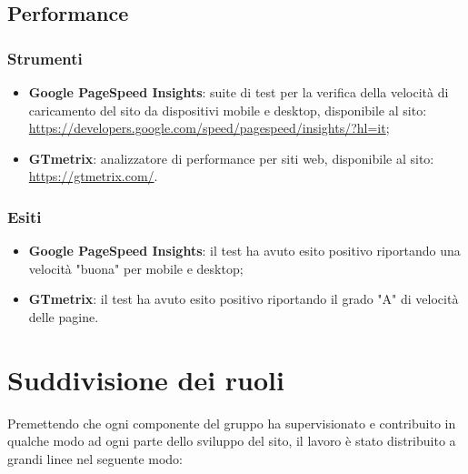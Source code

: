 \documentclass[12pt]{article}
\begin{document}
	\subsection{Performance}
	
	\subsubsection{Strumenti}
	
	\begin{itemize}
		\item \textbf{Google PageSpeed Insights}: suite di test per la verifica della velocità di caricamento del sito da dispositivi mobile e desktop, disponibile al sito:
		\\ \url{https://developers.google.com/speed/pagespeed/insights/?hl=it};
		
		\item \textbf{GTmetrix}: analizzatore di performance per siti web, disponibile al sito:
		\\ \url{https://gtmetrix.com/}.
	\end{itemize}
	
	\subsubsection{Esiti}
	
	\begin{itemize}
		\item \textbf{Google PageSpeed Insights}: il test ha avuto esito positivo riportando una velocità "buona" per mobile e desktop;
		
		\item \textbf{GTmetrix}: il test ha avuto esito positivo riportando il grado "A" di velocità delle pagine. 
	\end{itemize}

\newpage

	\section{Suddivisione dei ruoli}
	
	Premettendo che ogni componente del gruppo ha supervisionato e contribuito in qualche modo ad ogni parte dello sviluppo del sito, il lavoro è stato distribuito a grandi linee nel seguente modo:
	
\end{document}
